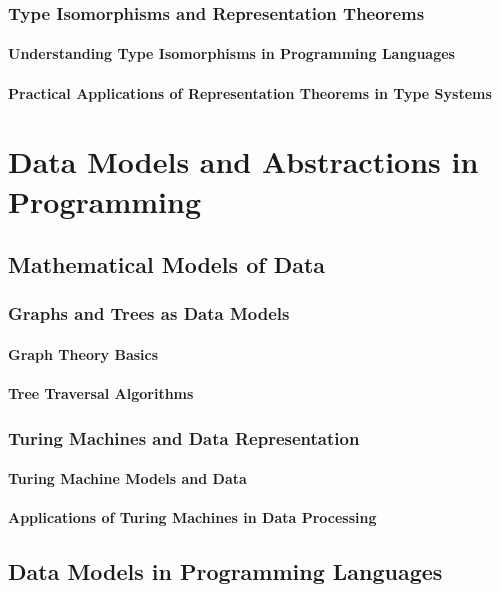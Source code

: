 \documentclass[12pt, oneside]{book}
\begin{document}
\subsection{Type Isomorphisms and Representation Theorems}
\subsubsection{Understanding Type Isomorphisms in Programming Languages}
\subsubsection{Practical Applications of Representation Theorems in Type Systems}

\chapter{Data Models and Abstractions in Programming}
\section{Mathematical Models of Data}
\subsection{Graphs and Trees as Data Models}
\subsubsection{Graph Theory Basics}
\subsubsection{Tree Traversal Algorithms}
\subsection{Turing Machines and Data Representation}
\subsubsection{Turing Machine Models and Data}
\subsubsection{Applications of Turing Machines in Data Processing}
\section{Data Models in Programming Languages}
\end{document}
